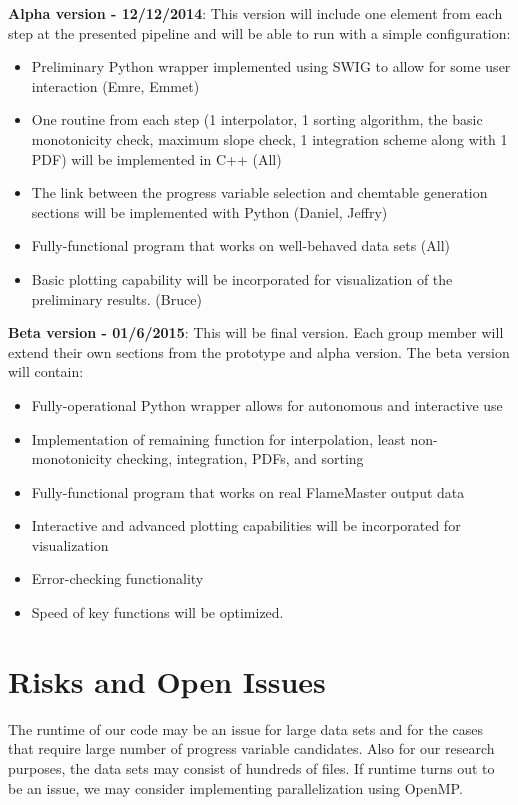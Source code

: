 \documentclass[11pt]{article}
\begin{document}
\noindent \textbf{Alpha version - 12/12/2014}: This version will
include one element from each step at the presented pipeline and will
be able to run with a simple configuration:
\begin{itemize}
\item Preliminary Python wrapper implemented using SWIG to allow
  for some user interaction (Emre, Emmet)
\item One routine from each step (1 interpolator, 1 sorting algorithm,
  the basic monotonicity check, maximum slope check, 1 integration
  scheme along with 1 PDF) will be implemented in C++ (All)
\item The link between the progress variable selection and chemtable
  generation sections will be implemented with Python (Daniel,
  Jeffry)
\item Fully-functional program that works on well-behaved data
  sets (All)
\item Basic plotting capability will be incorporated for visualization
  of the preliminary results.  (Bruce)
\end{itemize}

\noindent \textbf{Beta version - 01/6/2015}: This will be final
version.  Each group member will extend their own sections from the
prototype and alpha version. The beta version will contain:
\begin{itemize}
\item Fully-operational Python wrapper allows for autonomous and
  interactive use
\item Implementation of remaining function for interpolation, least
  non-monotonicity checking, integration, PDFs, and sorting
\item Fully-functional program that works on real FlameMaster output
  data
\item Interactive and advanced plotting capabilities will be
  incorporated for visualization
\item Error-checking functionality
\item Speed of key functions will be optimized.
\end{itemize}


\section{Risks and Open Issues}

The runtime of our code may be an issue for large data sets and for
the cases that require large number of progress variable
candidates. Also for our research purposes, the data sets may consist
of hundreds of files. If runtime turns out to be an issue, we
may consider implementing parallelization using OpenMP.
\end{document}
